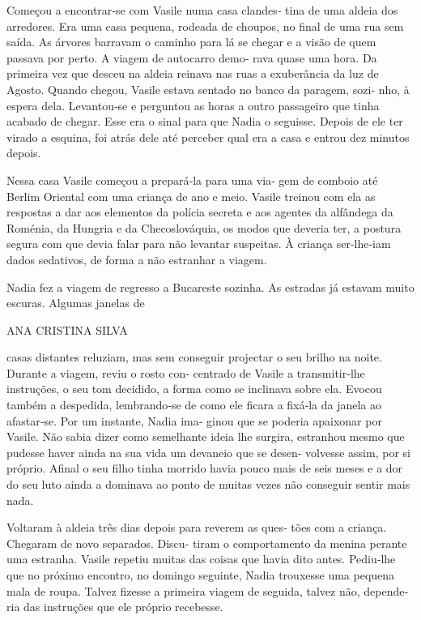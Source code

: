 Começou a encontrar‑se com Vasile numa casa clandes‑ tina de uma aldeia
dos arredores. Era uma casa pequena, rodeada de choupos, no final de uma
rua sem saída. As árvores barravam o caminho para lá se chegar e a visão
de quem passava por perto. A viagem de autocarro demo‑ rava quase uma
hora. Da primeira vez que desceu na aldeia reinava nas ruas a
exuberância da luz de Agosto. Quando chegou, Vasile estava sentado no
banco da paragem, sozi‑ nho, à espera dela. Levantou‑se e perguntou as
horas a outro passageiro que tinha acabado de chegar. Esse era o sinal
para que Nadia o seguisse. Depois de ele ter virado a esquina, foi atrás
dele até perceber qual era a casa e entrou dez minutos depois.

Nessa casa Vasile começou a prepará‑la para uma via‑ gem de comboio até
Berlim Oriental com uma criança de ano e meio. Vasile treinou com ela as
respostas a dar aos elementos da polícia secreta e aos agentes da
alfândega da Roménia, da Hungria e da Checoslováquia, os modos que
deveria ter, a postura segura com que devia falar para não levantar
suspeitas. À criança ser‑lhe‑iam dados sedativos, de forma a não
estranhar a viagem.

Nadia fez a viagem de regresso a Bucareste sozinha. As estradas já
estavam muito escuras. Algumas janelas de

ANA CRISTINA SILVA

casas distantes reluziam, mas sem conseguir projectar o seu brilho na
noite. Durante a viagem, reviu o rosto con‑ centrado de Vasile a
transmitir‑lhe instruções, o seu tom decidido, a forma como se inclinava
sobre ela. Evocou também a despedida, lembrando‑se de como ele ficara a
fixá‑la da janela ao afastar‑se. Por um instante, Nadia ima‑ ginou que
se poderia apaixonar por Vasile. Não sabia dizer como semelhante ideia
lhe surgira, estranhou mesmo que pudesse haver ainda na sua vida um
devaneio que se desen‑ volvesse assim, por si próprio. Afinal o seu
filho tinha morrido havia pouco mais de seis meses e a dor do seu luto
ainda a dominava ao ponto de muitas vezes não conseguir sentir mais
nada.

Voltaram à aldeia três dias depois para reverem as ques‑ tões com a
criança. Chegaram de novo separados. Discu‑ tiram o comportamento da
menina perante uma estranha. Vasile repetiu muitas das coisas que havia
dito antes. Pediu‑lhe que no próximo encontro, no domingo seguinte,
Nadia trouxesse uma pequena mala de roupa. Talvez fizesse a primeira
viagem de seguida, talvez não, depende‑ ria das instruções que ele
próprio recebesse.

